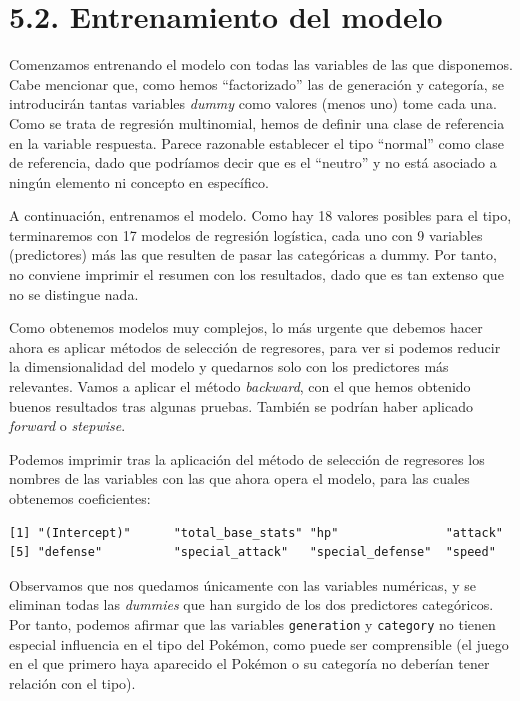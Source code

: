 \documentclass[
  12pt,
]{extreport}
\begin{document}
\section{5.2. Entrenamiento del modelo}\label{entrenamiento-del-modelo}

Comenzamos entrenando el modelo con todas las variables de las que
disponemos. Cabe mencionar que, como hemos ``factorizado'' las de
generación y categoría, se introducirán tantas variables \emph{dummy}
como valores (menos uno) tome cada una. Como se trata de regresión
multinomial, hemos de definir una clase de referencia en la variable
respuesta. Parece razonable establecer el tipo ``normal'' como clase de
referencia, dado que podríamos decir que es el ``neutro'' y no está
asociado a ningún elemento ni concepto en específico.

A continuación, entrenamos el modelo. Como hay 18 valores posibles para
el tipo, terminaremos con 17 modelos de regresión logística, cada uno
con 9 variables (predictores) más las que resulten de pasar las
categóricas a dummy. Por tanto, no conviene imprimir el resumen con los
resultados, dado que es tan extenso que no se distingue nada.

Como obtenemos modelos muy complejos, lo más urgente que debemos hacer
ahora es aplicar métodos de selección de regresores, para ver si podemos
reducir la dimensionalidad del modelo y quedarnos solo con los
predictores más relevantes. Vamos a aplicar el método \emph{backward},
con el que hemos obtenido buenos resultados tras algunas pruebas.
También se podrían haber aplicado \emph{forward} o \emph{stepwise}.

Podemos imprimir tras la aplicación del método de selección de
regresores los nombres de las variables con las que ahora opera el
modelo, para las cuales obtenemos coeficientes:

\begin{verbatim}
[1] "(Intercept)"      "total_base_stats" "hp"               "attack"          
[5] "defense"          "special_attack"   "special_defense"  "speed"           
\end{verbatim}

Observamos que nos quedamos únicamente con las variables numéricas, y se
eliminan todas las \emph{dummies} que han surgido de los dos predictores
categóricos. Por tanto, podemos afirmar que las variables
\texttt{generation} y \texttt{category} no tienen especial influencia en
el tipo del Pokémon, como puede ser comprensible (el juego en el que
primero haya aparecido el Pokémon o su categoría no deberían tener
relación con el tipo).
\end{document}
